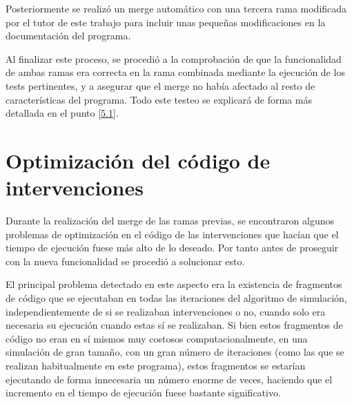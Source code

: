 Posteriormente se realizó un merge automático con una tercera rama modificada por el tutor de este trabajo para incluir unas pequeñas modificaciones en la documentación del programa.

Al finalizar este proceso, se procedió a la comprobación de que la funcionalidad de ambas ramas era correcta en la rama combinada mediante la ejecución de los tests pertinentes, y a asegurar que el merge no había afectado al resto de características del programa. Todo este testeo se explicará de forma más detallada en el punto \ref{5.1}.

\section{Optimización del código de intervenciones}\label{4.3}
Durante la realización del merge de las ramas previas, se encontraron algunos problemas de optimización en el código de las intervenciones que hacían que el tiempo de ejecución fuese más alto de lo deseado. Por tanto antes de proseguir con la nueva funcionalidad se procedió a solucionar esto.

El principal problema detectado en este aspecto era la existencia de fragmentos de código que se ejecutaban en todas las iteraciones del algoritmo de simulación, independientemente de si se realizaban intervenciones o no, cuando solo era necesaria su ejecución cuando estas sí se realizaban. Si bien estos fragmentos de código no eran en sí mismos muy costosos computacionalmente, en una simulación de gran tamaño, con un gran número de iteraciones (como las que se realizan habitualmente en este programa), estos fragmentos se estarían ejecutando de forma innecesaria un número enorme de veces, haciendo que el incremento en el tiempo de ejecución fuese bastante significativo.

